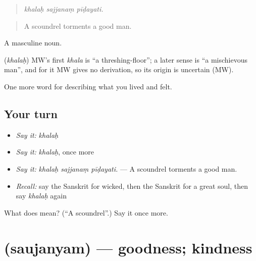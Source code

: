 \begin{quote}
  
\end{quote}

\begin{quote}
\emph{khalaḥ sajjanaṃ pīḍayati.}
\end{quote}

\begin{quote}
A scoundrel torments a good man.
\end{quote}

A masculine noun.

\begin{cousinweb}
\textbf{} (\emph{khalaḥ}) MW's first \emph{khala} is \textquotedblleft{}a threshing-floor\textquotedblright{}; a later sense is \textquotedblleft{}a mischievous man\textquotedblright{}, and for it MW gives no derivation, so its origin is uncertain (MW).
\end{cousinweb}

\begin{grammarlens}[title={What you've built}]
One more word for describing what you lived and felt.
\end{grammarlens}

\subsection*{Your turn}
\begin{itemize}
\raggedright
  \item \emph{Say it:} \emph{khalaḥ}
  \item \emph{Say it:} \emph{khalaḥ}, once more
  \item \emph{Say it:} \emph{khalaḥ sajjanaṃ pīḍayati.} — A scoundrel torments a good man.
  \item \emph{Recall:} say the Sanskrit for wicked, then the Sanskrit for a great soul, then say \emph{khalaḥ} again
\end{itemize}

\begin{tcolorbox}[breakable,colback=teal!4,colframe=teal!35!black,title={Before you move on}]
What does  mean? (\textquotedblleft{}A scoundrel\textquotedblright{}.) Say it once more.
\end{tcolorbox}
\section[\texorpdfstring{\sk{सौजन्यम्} (saujanyam)}{सौजन्यम् (saujanyam)}]{ (saujanyam) — goodness; kindness}


